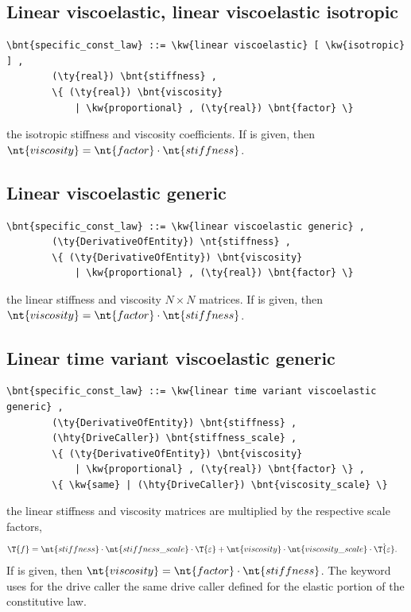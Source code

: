 \subsection{Linear viscoelastic, linear viscoelastic isotropic}
\begin{Verbatim}[commandchars=\\\{\}]
    \bnt{specific_const_law} ::= \kw{linear viscoelastic} [ \kw{isotropic} ] ,
        (\ty{real}) \bnt{stiffness} ,
        \{ (\ty{real}) \bnt{viscosity}
            | \kw{proportional} , (\ty{real}) \bnt{factor} \}
\end{Verbatim}
the isotropic stiffness and viscosity coefficients.
If  is given, then
$\nt{viscosity} = \nt{factor} \cdot \nt{stiffness}$.
  
\subsection{Linear viscoelastic generic}
\begin{Verbatim}[commandchars=\\\{\}]
    \bnt{specific_const_law} ::= \kw{linear viscoelastic generic} ,  
        (\ty{DerivativeOfEntity}) \nt{stiffness} ,
        \{ (\ty{DerivativeOfEntity}) \bnt{viscosity} 
            | \kw{proportional} , (\ty{real}) \bnt{factor} \}
\end{Verbatim}
the linear stiffness and viscosity $N \times N$ matrices.
If  is given, then
$\nt{viscosity} = \nt{factor} \cdot \nt{stiffness}$.
  
\subsection{Linear time variant viscoelastic generic}
\begin{Verbatim}[commandchars=\\\{\}]
    \bnt{specific_const_law} ::= \kw{linear time variant viscoelastic generic} ,
        (\ty{DerivativeOfEntity}) \bnt{stiffness} ,
        (\hty{DriveCaller}) \bnt{stiffness_scale} ,
        \{ (\ty{DerivativeOfEntity}) \bnt{viscosity}
            | \kw{proportional} , (\ty{real}) \bnt{factor} \} ,
        \{ \kw{same} | (\hty{DriveCaller}) \bnt{viscosity_scale} \}
\end{Verbatim}
the linear stiffness and viscosity matrices are multiplied
by the respective scale factors,
\begin{align}
	\T{f} &= \nt{stiffness} \cdot \nt{stiffness\_scale} \cdot \T{\varepsilon}
		+ \nt{viscosity} \cdot \nt{viscosity\_scale} \cdot \dot{\T{\varepsilon}}
	.
\end{align}
If  is given, then
$\nt{viscosity} = \nt{factor} \cdot \nt{stiffness}$.
The keyword  uses for the drive caller  the same drive caller  defined for the elastic portion of the constitutive law.

